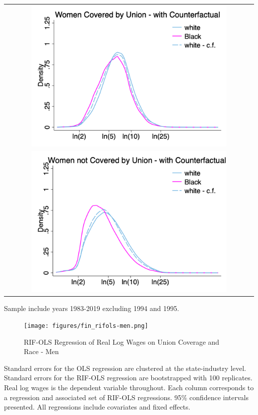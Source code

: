 \documentclass[11pt]{article}
\begin{document}
{\pagebreak
\begin{table}[h!]
    \centering
    \label{fig:dfl_women}
    \begin{tabular}{c}
          \includegraphics[width = 0.8\textwidth, keepaspectratio]{figures/kde1wom/fin_cu_bhw_wom.png} \\
          \includegraphics[width = 0.8\textwidth, keepaspectratio]{figures/kde1wom/fin_cn_bhw_wom.png}
    \end{tabular}
\end{table}
\footnotesize{Sample include years 1983-2019 excluding 1994 and 1995.}

\pagebreak
\begin{landscape}
\begin{figure}[ht!]
\centering
    \caption{RIF-OLS Regression of Real Log Wages on Union Coverage and Race - Men}\label{fig:rifols-men}
    \texttt{[image: figures/fin\_rifols-men.png]}
\end{figure}
\footnotesize{Standard errors for the OLS regression are clustered at the state-industry level. Standard errors for the RIF-OLS regression are bootstrapped with 100 replicates. Real log wages is the dependent variable throughout. Each column corresponds to a regression and associated set of RIF-OLS regressions. 95\% confidence intervals presented. All regressions include covariates and fixed effects.}
\end{landscape}

}
\end{document}
